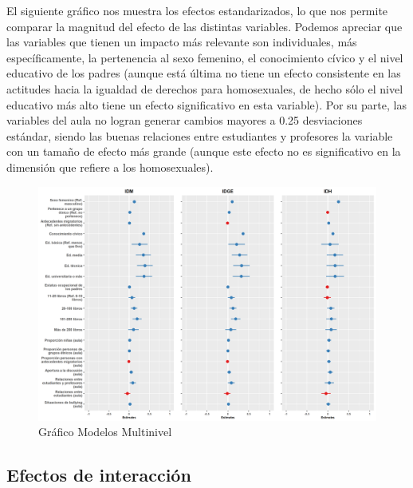 \documentclass[12pt,twoside]{templates/facsothesis}
\begin{document}
El siguiente gráfico nos muestra los efectos estandarizados, lo que nos permite comparar la magnitud del efecto de las distintas variables. Podemos apreciar que las variables que tienen un impacto más relevante son individuales, más específicamente, la pertenencia al sexo femenino, el conocimiento cívico y el nivel educativo de los padres (aunque está última no tiene un efecto consistente en las actitudes hacia la igualdad de derechos para homosexuales, de hecho sólo el nivel educativo más alto tiene un efecto significativo en esta variable). Por su parte, las variables del aula no logran generar cambios mayores a 0.25 desviaciones estándar, siendo las buenas relaciones entre estudiantes y profesores la variable con un tamaño de efecto más grande (aunque este efecto no es significativo en la dimensión que refiere a los homosexuales).

\begin{figure}[H]

{\centering \includegraphics[width=0.9\linewidth]{input/images/EFECTOSTABLAREGRESION} 

}

\caption{Gráfico Modelos Multinivel}\label{fig:unnamed-chunk-10}
\end{figure}

\newpage

\hypertarget{efectos-de-interacciuxf3n}{%
\subsection{Efectos de interacción}\label{efectos-de-interacciuxf3n}}
\end{document}
